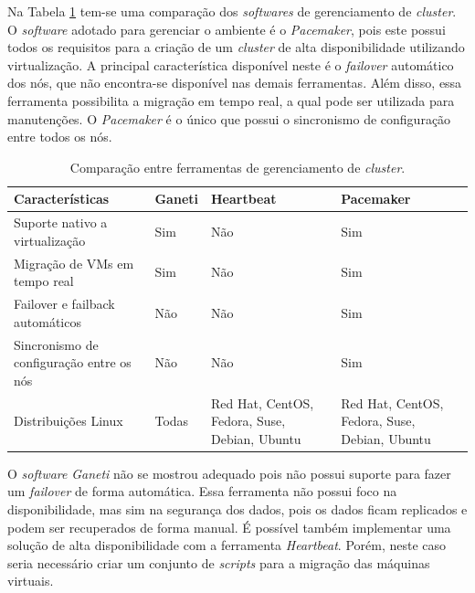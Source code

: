 Na Tabela \ref{tab:clusterger} tem-se uma comparação dos \textit{softwares} de gerenciamento de \textit{cluster}. 
O \textit{software} adotado para gerenciar o ambiente é o \textit{Pacemaker}, pois este possui todos os requisitos para a criação de um 
\textit{cluster} de alta disponibilidade utilizando virtualização. A principal característica disponível neste é o \textit{failover} automático
dos nós, que não encontra-se disponível nas demais ferramentas. Além disso, essa ferramenta possibilita a migração em tempo real, 
a qual pode ser utilizada para manutenções. O \textit{Pacemaker} é o único que possui o sincronismo de configuração entre todos 
os nós. 

\begin{table}[h!]
\caption{Comparação entre ferramentas de gerenciamento de \textit{cluster}.}
\label{tab:clusterger}
\begin{center}
\begin{tabular}{|p{4cm}|p{2cm}|p{3.5cm}|p{3.5cm}|}\hline
\textbf{Características} & \textbf{Ganeti} & \textbf{Heartbeat} & \textbf{Pacemaker} \\\hline
Suporte nativo a virtualização & Sim & Não & Sim \\\hline
Migração de \acp{VM} em tempo real & Sim & Não & Sim \\\hline
Failover e failback automáticos & Não & Não & Sim \\\hline
Sincronismo de configuração entre os nós & Não & Não & Sim \\\hline
Distribuições Linux & Todas & Red Hat, CentOS, Fedora, Suse, Debian, Ubuntu & Red Hat, CentOS, Fedora, Suse, Debian, Ubuntu \\\hline
\end{tabular}
\end{center}
\end{table}

O \textit{software} \textit{Ganeti} não se mostrou adequado pois não possui suporte para fazer um \textit{failover} de forma automática. 
Essa ferramenta não possui foco na disponibilidade, mas sim na segurança dos dados, pois os dados ficam replicados e podem ser recuperados de forma
manual. É possível também implementar uma solução de alta disponibilidade com a ferramenta \textit{Heartbeat}. Porém, neste caso seria necessário 
criar um conjunto de \textit{scripts} para a migração das máquinas virtuais.

